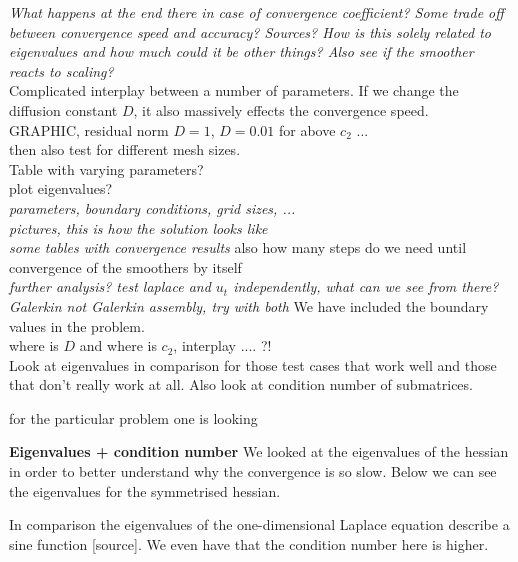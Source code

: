 \documentclass[../draft_1.tex]{subfiles}
\begin{document}
\textit{What happens at the end there in case of convergence coefficient? Some trade off between convergence speed and accuracy? Sources? How is this solely related to eigenvalues and how much could it be other things? Also see if the smoother reacts to scaling?}
\\
Complicated interplay between a number of parameters. If we change the diffusion constant $D$, it also massively effects the convergence speed. 
\\
GRAPHIC, residual norm $D = 1$, $D= 0.01$ for above $c_2$ ... 
\\
then also test for different mesh sizes. 
\\
Table with varying parameters? 
\\ 
plot eigenvalues?
\\
\textit{parameters, boundary conditions, grid sizes, ...}
\bigskip
\\
\textit{pictures, this is how the solution looks like}
\bigskip
\\
\textit{some tables with convergence results}
also how many steps do we need until convergence of the smoothers by itself
\bigskip
\\
\textit{further analysis? test laplace and $u_t$ independently, what can we see from there?}
\\
\textit{Galerkin not Galerkin assembly, try with both}
We have included the boundary values in the problem. 
\\
where is $D$ and where is $c_2$, interplay .... ?!
\\
Look at eigenvalues in comparison for those test cases that work well and those that don't really work at all. Also look at condition number of submatrices.

 for the particular problem one is looking 

\textbf{Eigenvalues + condition number}
We looked at the eigenvalues of the hessian in order to better understand why the convergence is so slow. Below we can see the eigenvalues for the symmetrised hessian. 

In comparison the eigenvalues of the one-dimensional Laplace equation describe a sine function [source]. We even have that the condition number here is higher. 
\end{document}
